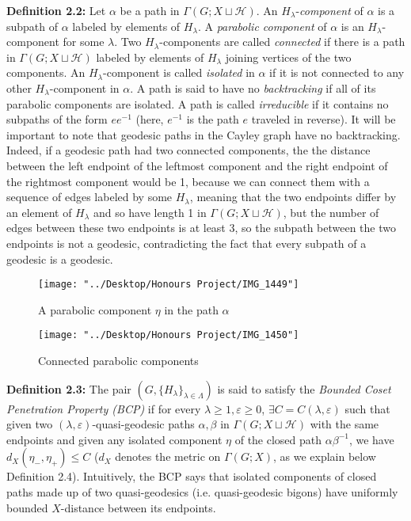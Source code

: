 \documentclass[12pt]{article}
\newcommand{\vs}{\vskip10pt}
\begin{document}
	\textbf{Definition 2.2: } Let $\alpha$ be a path in $\Gamma(G; X \sqcup \mathcal{H})$. An $H_{\lambda}$-\textit{component} of $\alpha$ is a subpath of $\alpha$ labeled by elements of $H_{\lambda}$. A \textit{parabolic component} of $\alpha$ is an $H_{\lambda}$-component for some $\lambda$. Two $H_{\lambda}$-components are called \textit{connected} if there is a path in $\Gamma(G; X \sqcup \mathcal{H})$ labeled by elements of $H_{\lambda}$ joining vertices of the two components. An $H_{\lambda}$-component is called \textit{isolated} in $\alpha$ if it is not connected to any other $H_{\lambda}$-component in $\alpha$. A path is said to have no \textit{backtracking} if all of its parabolic components are isolated. A path is called \textit{irreducible} if it contains no subpaths of the form $ee^{-1}$ (here, $e^{-1}$ is the path $e$ traveled in reverse). It will be important to note that geodesic paths in the Cayley graph have no backtracking. Indeed, if a geodesic path had two connected components, the the distance between the left endpoint of the leftmost component and the right endpoint of the rightmost component would be 1, because we can connect them with a sequence of edges labeled by some $H_\lambda$, meaning that the two endpoints differ by an element of $H_\lambda$ and so have length 1 in $\Gamma(G; X \sqcup \mathcal{H})$, but the number of edges between these two endpoints is at least 3, so the subpath between the two endpoints is not a geodesic, contradicting the fact that every subpath of a geodesic is a geodesic. 
	
\begin{figure} [H]
	\centering
	\texttt{[image: "../Desktop/Honours Project/IMG\_1449"]}
	\caption{A parabolic component $\eta$ in the path $\alpha$}
	\label{fig:img1449}
\end{figure}

\begin{figure} [H]
	\centering
	\texttt{[image: "../Desktop/Honours Project/IMG\_1450"]}
	\caption{Connected parabolic components}
	\label{fig:img1450}
\end{figure}

	
	\vs 
	
	\textbf{Definition 2.3: } The pair $(G, \{H_{\lambda}\}_{\lambda \in \Lambda})$ is said to satisfy the \textit{Bounded Coset Penetration Property (BCP)} if for every $\lambda \geq 1, \varepsilon \geq 0$, $\exists C = C(\lambda, \varepsilon)$ such that given two $(\lambda, \varepsilon)$-quasi-geodesic paths $\alpha, \beta$ in $\Gamma(G; X \sqcup \mathcal{H})$ with the same endpoints and given any isolated component $\eta$ of the closed path $\alpha\beta^{-1}$, we have $d_X(\eta_{-}, \eta_{+}) \leq C$ ($d_X$ denotes the metric on $\Gamma(G;X)$, as we explain below Definition 2.4). Intuitively, the BCP says that isolated components of closed paths made up of two quasi-geodesics (i.e. quasi-geodesic bigons) have uniformly bounded $X$-distance between its endpoints. 
	
\end{document}
